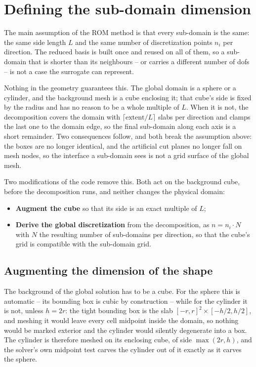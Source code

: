 \section{Defining the sub-domain dimension}

The main assumption of the ROM method is that every sub-domain is the same: the same side length $L$ and the same number of discretization points $n_i$ per direction. The reduced basis is built once and reused on all of them, so a sub-domain that is shorter than its neighbours -- or carries a different number of dofs -- is not a case the surrogate can represent.

Nothing in the geometry guarantees this. The global domain is a sphere or a cylinder, and the background mesh is a cube enclosing it; that cube's side is fixed by the radius and has no reason to be a whole multiple of $L$. When it is not, the decomposition covers the domain with $\lceil \text{extent}/L \rceil$ slabs per direction and clamps the last one to the domain edge, so the final sub-domain along each axis is a short remainder. Two consequences follow, and both break the assumption above: the boxes are no longer identical, and the artificial cut planes no longer fall on mesh nodes, so the interface a sub-domain sees is not a grid surface of the global mesh.

Two modifications of the code remove this. Both act on the background cube, before the decomposition runs, and neither changes the physical domain:

\begin{itemize}
    \item \textbf{Augment the cube} so that its side is an exact multiple of $L$;
    \item \textbf{Derive the global discretization} from the decomposition, as $n = n_i \cdot N$ with $N$ the resulting number of sub-domains per direction, so that the cube's grid is compatible with the sub-domain grid.
\end{itemize}

\subsection*{Augmenting the dimension of the shape}

The background of the global solution has to be a cube. For the sphere this is automatic -- its bounding box is cubic by construction -- while for the cylinder it is not, unless $h = 2r$: the tight bounding box is the slab $[-r,r]^2 \times [-h/2,h/2]$, and meshing it would leave every cell midpoint inside the domain, so nothing would be marked exterior and the cylinder would silently degenerate into a box. The cylinder is therefore meshed on its enclosing cube, of side $\max(2r, h)$, and the solver's own midpoint test carves the cylinder out of it exactly as it carves the sphere.

